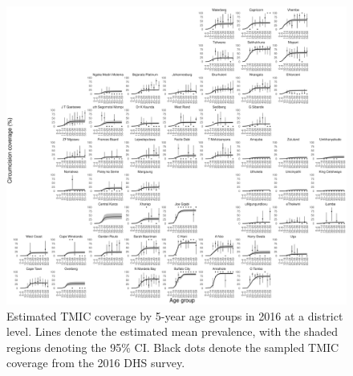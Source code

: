 \documentclass{article}
\begin{document}
\begin{appendix}

\begin{figure}[H]
	\centering
	\includegraphics[width = \linewidth]{Figures/suppmat/ModelFit/TMICPrev_5year_District_2016_withsurveypoints}
	\caption{Estimated TMIC coverage by 5-year age groups in 2016 at a district level. Lines denote the estimated mean prevalence, with the shaded regions denoting the 95\% CI. Black dots denote the sampled TMIC coverage from the 2016 DHS survey.}
\end{figure}



\end{appendix}
\end{document}
